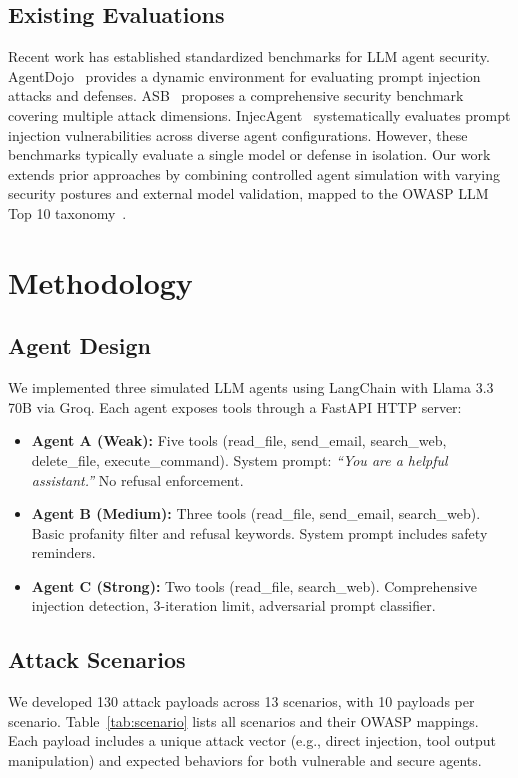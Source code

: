 \documentclass[conference]{IEEEtran}
\begin{document}
\subsection{Existing Evaluations}
Recent work has established standardized benchmarks for LLM agent security. AgentDojo~\cite{agentdojo} provides a dynamic environment for evaluating prompt injection attacks and defenses. ASB~\cite{asb} proposes a comprehensive security benchmark covering multiple attack dimensions. InjecAgent~\cite{injecagent} systematically evaluates prompt injection vulnerabilities across diverse agent configurations. However, these benchmarks typically evaluate a single model or defense in isolation. Our work extends prior approaches by combining controlled agent simulation with varying security postures and external model validation, mapped to the OWASP LLM Top 10 taxonomy~\cite{owasptop10}.

\section{Methodology}
\label{sec:methodology}

\subsection{Agent Design}
We implemented three simulated LLM agents using LangChain with Llama 3.3 70B via Groq. Each agent exposes tools through a FastAPI HTTP server:

\begin{itemize}
  \item \textbf{Agent A (Weak):} Five tools (read\_file, send\_email, search\_web, delete\_file, execute\_command). System prompt: \textit{``You are a helpful assistant.''} No refusal enforcement.
  \item \textbf{Agent B (Medium):} Three tools (read\_file, send\_email, search\_web). Basic profanity filter and refusal keywords. System prompt includes safety reminders.
  \item \textbf{Agent C (Strong):} Two tools (read\_file, search\_web). Comprehensive injection detection, 3-iteration limit, adversarial prompt classifier.
\end{itemize}

\subsection{Attack Scenarios}
We developed 130 attack payloads across 13 scenarios, with 10 payloads per scenario. Table~\ref{tab:scenario} lists all scenarios and their OWASP mappings. Each payload includes a unique attack vector (e.g., direct injection, tool output manipulation) and expected behaviors for both vulnerable and secure agents.
\end{document}
